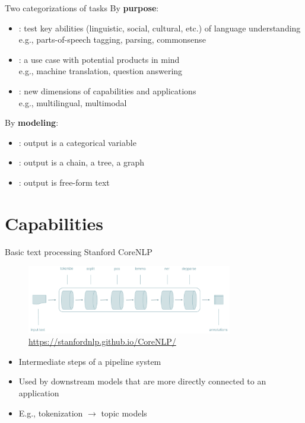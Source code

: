 \documentclass[usenames,dvipsnames,notes,11pt,aspectratio=169,hyperref={colorlinks=true, linkcolor=blue}]{beamer}
\begin{document}
\begin{frame}
    {Two categorizations of tasks}
    By \textbf{purpose}:\\
    \begin{itemize}
        \item {}: test key abilities (linguistic, social, cultural, etc.) of language understanding\\
            e.g., parts-of-speech tagging, parsing, commonsense
        \item {}: a use case with potential products in mind\\
            e.g., machine translation, question answering
        \item {}: new dimensions of capabilities and applications\\
            e.g., multilingual, multimodal
    \end{itemize}

    \pause
    \medskip
    By \textbf{modeling}:\\
    \begin{itemize}
        \item {}: output is a categorical variable
        \item {}: output is a chain, a tree, a graph
        \item {}: output is free-form text 
    \end{itemize}
\end{frame}

\section{Capabilities}

\begin{frame}
    {Basic text processing}
    Stanford CoreNLP\vspace{-0cm}
    \begin{figure}
        \includegraphics[height=3cm]{figures/pipeline}
        \caption{\url{https://stanfordnlp.github.io/CoreNLP/}}
    \end{figure}\vspace{-0cm}

    \begin{itemize}
        \item Intermediate steps of a pipeline system
        \item Used by downstream models that are more directly connected to an application 
        \item E.g., tokenization $\longrightarrow$ topic models
    \end{itemize}
\end{frame}
\end{document}

